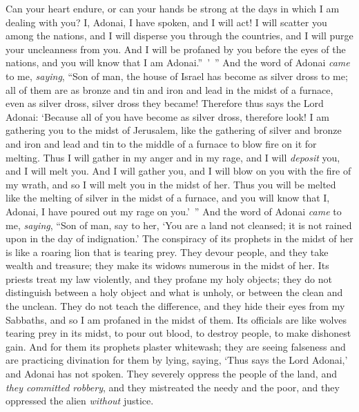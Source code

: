 \begin{biblechapter}
\verse Can your heart endure, or can your hands be strong at the days in which I am dealing with you? I, Adonai, I have spoken, and I will act!
\verse I will scatter you among the nations, and I will disperse you through the countries, and I will purge your uncleanness from you.
\verse And I will be profaned by you before the eyes of the nations, and you will know that I am Adonai.” ’ ”
\verse And the word of Adonai \textit{came} to me, \textit{saying},
\verse “Son of man, the house of Israel has become as silver dross to me; all of them are as bronze and tin and iron and lead in the midst of a furnace, even as silver dross, silver dross they became!
\verse Therefore thus says the Lord Adonai: ‘Because all of you have become as silver dross, therefore look! I am gathering you to the midst of Jerusalem,
\verse like the gathering of silver and bronze and iron and lead and tin to the middle of a furnace to blow fire on it for melting. Thus I will gather in my anger and in my rage, and I will \textit{deposit} you, and I will melt you.
\verse And I will gather you, and I will blow on you with the fire of my wrath, and so I will melt you in the midst of her.
\verse Thus you will be melted like the melting of silver in the midst of a furnace, and you will know that I, Adonai, I have poured out my rage on you.’ ”
\verse And the word of Adonai \textit{came} to me, \textit{saying},
\verse “Son of man, say to her, ‘You are a land not cleansed; it is not rained upon in the day of indignation.’
\verse The conspiracy of its prophets in the midst of her is like a roaring lion that is tearing prey. They devour people, and they take wealth and treasure; they make its widows numerous in the midst of her.
\verse Its priests treat my law violently, and they profane my holy objects; they do not distinguish between a holy object and what is unholy, or between the clean and the unclean. They do not teach the difference, and they hide their eyes from my Sabbaths, and so I am profaned in the midst of them.
\verse Its officials are like wolves tearing prey in its midst, to pour out blood, to destroy people, to make dishonest gain.
\verse And for them its prophets plaster whitewash; they are seeing falseness and are practicing divination for them by lying, saying, ‘Thus says the Lord Adonai,’ and Adonai has not spoken.
\verse They severely oppress the people of the land, and \textit{they committed robbery}, and they mistreated the needy and the poor, and they oppressed the alien \textit{without} justice.

\end{biblechapter}
